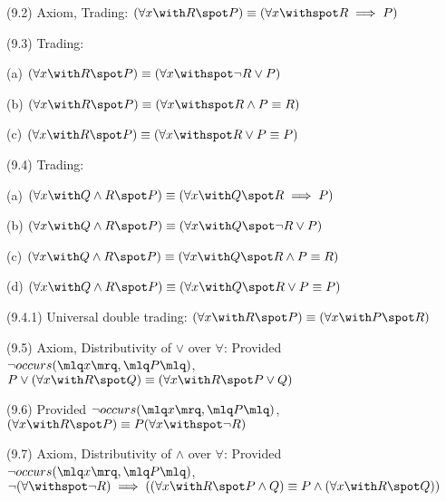 \documentclass[a4paper,10pt]{article}
\newenvironment{theoremlist}{
\begin{description}
  \setlength{\itemsep}{1.5pt}
  \setlength{\parskip}{0pt}
  \setlength{\parsep}{0pt}
}{\end{description}}
\begin{document}
\begin{theoremlist}
\item[(9.2) Axiom, Trading:]							$ (\forall x \with R \spot P) \equiv (\forall x \withspot R \implies P) $
\item[(9.3) Trading:]
  \begin{theoremlist}
  \item %
  \item[(a)]									$ (\forall x \with R \spot P) \equiv (\forall x \withspot \lnot R \lor P) $
  \item[(b)] 									$ (\forall x \with R \spot P) \equiv (\forall x \withspot R \land P \equiv R) $
  \item[(c)] 									$ (\forall x \with R \spot P) \equiv (\forall x \withspot R \lor P \equiv P) $
  \end{theoremlist}
\item[(9.4) Trading:]
  \begin{theoremlist}
  \item %
  \item[(a)]									$ (\forall x \with Q \land R \spot P) \equiv (\forall x \with Q \spot R \implies P) $
  \item[(b)] 									$ (\forall x \with Q \land R \spot P) \equiv (\forall x \with Q \spot \lnot R \lor P) $
  \item[(c)] 									$ (\forall x \with Q \land R \spot P) \equiv (\forall x \with Q \spot R \land P \equiv R) $
  \item[(d)] 									$ (\forall x \with Q \land R \spot P) \equiv (\forall x \with Q \spot R \lor P \equiv P) $
  \end{theoremlist}
\item[(9.4.1) Universal double trading:]					$ (\forall x \with R \spot P) \equiv (\forall x \with P \spot R) $

\item[(9.5) Axiom, Distributivity of $\lor$ over $\forall$:]			Provided $ \lnot occurs (\mlq x \mrq, \mlq P \mlq)$,\newline
										$ P \lor (\forall x \with R \spot Q) \equiv (\forall x \with R \spot P \lor Q) $

\item[(9.6)]									Provided $ \lnot occurs (\mlq x \mrq, \mlq P \mlq)$, 
										$ (\forall x \with R \spot P) \equiv P (\forall x \withspot \lnot R) $

\item[(9.7) Axiom, Distributivity of $\land$ over $\forall$:]			Provided $ \lnot occurs (\mlq x \mrq, \mlq P \mlq)$,\newline
										$ \lnot(\forall \withspot \lnot R) \implies ((\forall x \with R \spot P \land Q) \equiv P \land (\forall x \with R \spot Q)) $


\end{theoremlist}
\end{document}
